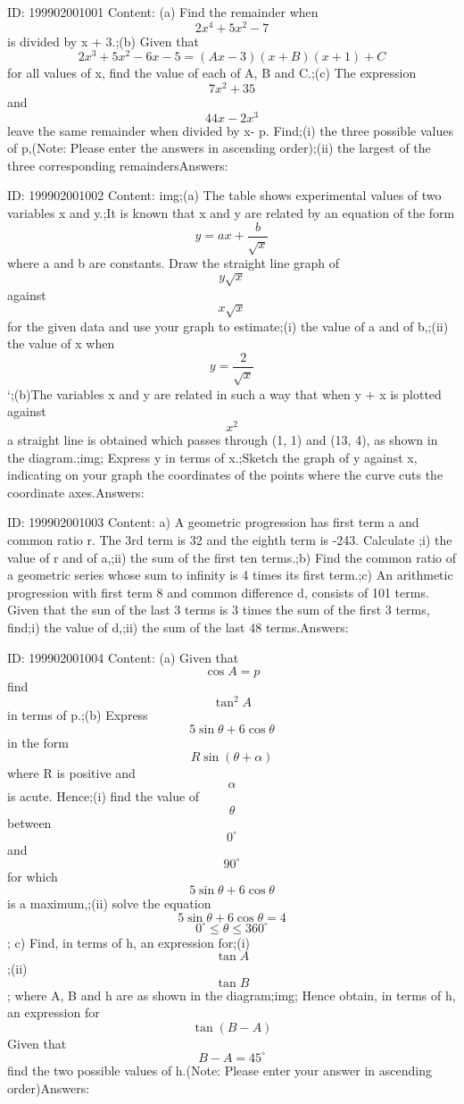 \documentclass{article}
\begin{document}
ID: 199902001001
Content:
(a) Find the remainder when \[2x^4+5x^2-7\] is divided by x + 3.;(b) Given that \[2x^3+5x^2-6x-5 =(Ax-3)(x+B)(x+1)+C\] for all values of x, find the value of each of A, B and C.;(c) The expression \[7x^2+35\] and \[44x-2x^3\] leave the same remainder when divided by x- p. Find;(i) the three possible values of p,(Note: Please enter the answers in ascending order);(ii) the largest of the three corresponding remaindersAnswers:

ID: 199902001002
Content:
img;(a)	The table shows experimental values of two variables x and y.;It is known that x and y are related by an equation of the form \[y=ax+\frac{b}{\sqrt{x}}\] where a and b are constants. Draw the straight line graph of \[y\sqrt{x}\] against \[x\sqrt{x}\] for the given data and use your graph to estimate;(i)	the value of a and of b,;(ii)	the value of x when \[y=\frac{2}{\sqrt{x}}\] `;(b)The variables x and y are related in such a way that when y + x is plotted against \[x^2\] a straight line is obtained which passes through (1, 1) and (13, 4), as shown in the diagram.;img; Express y in terms of x.;Sketch the graph of y against x, indicating on your graph the coordinates of the points where the curve cuts the coordinate axes.Answers:

ID: 199902001003
Content:
a) A geometric progression has first term a and common ratio r. The 3rd term is 32 and the eighth term is -243. Calculate ;i) the value of r and of a,;ii) the sum of the first ten terms.;b) Find the common ratio of a geometric series whose sum to infinity is 4 times its first term.;c) An arithmetic progression with first term 8 and common difference d, consists of 101 terms. Given that the sun of the last 3 terms is 3 times the sum of the first 3 terms, find;i) the value of d,;ii) the sum of the last 48 terms.Answers:

ID: 199902001004
Content:
(a) Given that \[\cos A = p\] find \[\tan^2A\] in terms of p.;(b)	Express \[5\sin\theta+6\cos\theta\] in the form \[R\sin(\theta + \alpha)\] where R is positive and \[\alpha\] is acute. Hence;(i) find the value of \[\theta\] between \[0^{\circ}\] and \[90^{\circ}\] for which \[5\sin\theta+6\cos\theta\] is a maximum,;(ii)	solve the equation \[5\sin\theta+6\cos\theta=4\]  \[0^{\circ}\leq \theta\leq 360^{\circ}\]; c) Find, in terms of h, an expression for;(i) \[\tan A\];(ii) \[\tan B\]; where A, B and h are as shown in the diagram;img; Hence obtain, in terms of h, an expression for \[\tan (B-A)\] Given that \[B-A=45^{\circ}\] find the two possible values of h.(Note: Please enter your answer in ascending order)Answers:
\end{document}
